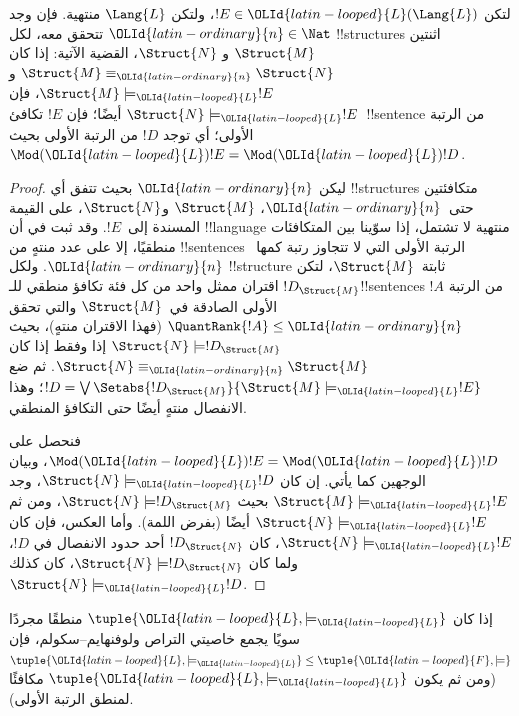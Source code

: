 \documentclass[../../../include/open-logic-section]{subfiles}
\begin{document}


\begin{lem}
لتكن $!E \in \OLId{latin-looped}{L}(\Lang{L})$، ولتكن $\Lang{L}$ منتهية. فإن
وجد $\OLId{latin-ordinary}{n} \in \Nat$ تتحقق معه، لكل !!{structure}s اثنتين $\Struct{M}$ و
$\Struct{N}$، القضية الآتية: إذا كان $\Struct{M} \equiv_\OLId{latin-ordinary}{n} \Struct{N}$ و
$\Struct{M} \models_\OLId{latin-looped}{L} !E$، فإن $\Struct{N} \models_\OLId{latin-looped}{L} !E$ أيضًا؛
فإن $!E$ تكافئ~!!{sentence} من الرتبة الأولى؛ أي توجد $!D$ من الرتبة
الأولى بحيث $\Mod(\OLId{latin-looped}{L}){!E}=\Mod(\OLId{latin-looped}{L}){!D}$.
\end{lem}

\begin{proof}
ليكن $\OLId{latin-ordinary}{n}$ بحيث تتفق أي !!{structure}s متكافئتين حتى~$\OLId{latin-ordinary}{n}$، $\Struct{M}$
و$\Struct{N}$، على القيمة المسندة إلى~$!E$. وقد ثبت في
 أن !!{language} منتهية لا تشتمل، إذا سوّينا بين المتكافئات
منطقيًا، إلا على عدد منتهٍ من !!{sentence}s الرتبة الأولى التي لا
تتجاوز رتبة كمها~$\OLId{latin-ordinary}{n}$. ولكل !!{structure} ثابتة~$\Struct{M}$، لتكن
$!D_{\Struct{M}}$ اقتران ممثل واحد من كل فئة تكافؤ منطقي للـ!!{sentence}s
$!A$ من الرتبة الأولى الصادقة في~$\Struct{M}$ والتي تحقق
$\QuantRank{!A} \le \OLId{latin-ordinary}{n}$ (فهذا الاقتران منتهٍ)، بحيث
$\Struct{N} \models !D_{\Struct{M}}$ إذا وفقط إذا كان
$\Struct{N} \equiv_\OLId{latin-ordinary}{n} \Struct{M}$. ثم ضع
$!D = \textstyle\bigvee
\Setabs{!D_{\Struct{M}}}{\Struct{M} \models_\OLId{latin-looped}{L} !E}$؛ وهذا الانفصال منتهٍ
أيضًا حتى التكافؤ المنطقي.

فنحصل على $\Mod(\OLId{latin-looped}{L}){!E}=\Mod(\OLId{latin-looped}{L}){!D}$، وبيان الوجهين كما يأتي. إن كان
$\Struct{N} \models_\OLId{latin-looped}{L} !D$، وجد $\Struct{M} \models_\OLId{latin-looped}{L} !E$ بحيث
$\Struct{N} \models !D_{\Struct{M}}$، ومن ثم
$\Struct{N} \models_\OLId{latin-looped}{L} !E$ أيضًا (بفرض اللمة). وأما العكس، فإن كان
$\Struct{N} \models_\OLId{latin-looped}{L} !E$، كان $!D_\Struct{N}$ أحد حدود الانفصال في
$!D$، ولما كان $\Struct{N} \models !D_\Struct{N}$، كان كذلك
$\Struct{N} \models_\OLId{latin-looped}{L} !D$.
\end{proof}

\begin{thm}
   إذا كان $\tuple{\OLId{latin-looped}{L},\models_\OLId{latin-looped}{L}}$ منطقًا مجردًا سويًا
  يجمع خاصيتي التراص ولوفنهايم--سكولم، فإن
  $\tuple{\OLId{latin-looped}{L},\models_\OLId{latin-looped}{L}} \le \tuple{\OLId{latin-looped}{F},\models}$ (ومن ثم يكون
  $\tuple{\OLId{latin-looped}{L},\models_\OLId{latin-looped}{L}}$ مكافئًا لمنطق الرتبة الأولى).
\end{thm}
\end{document}
